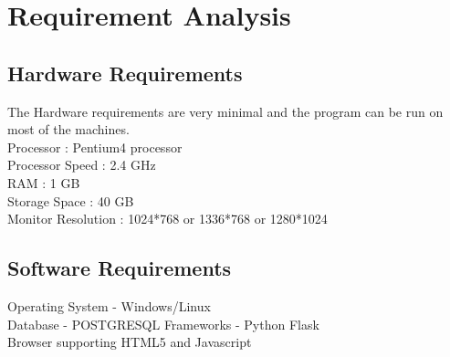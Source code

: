 \chapter{Requirement Analysis}

\section{Hardware Requirements}
The Hardware requirements are very minimal and the program can be run on most of
the machines. \\
Processor : Pentium4 processor\\
Processor Speed : 2.4 GHz\\
RAM : 1 GB\\
Storage Space : 40 GB\\
Monitor Resolution : 1024*768 or 1336*768 or 1280*1024\\
\thispagestyle{fancy}

\section{Software Requirements}
Operating System - Windows/Linux\\
Database - POSTGRESQL
Frameworks - Python Flask\\
Browser supporting HTML5 and Javascript
\thispagestyle{fancy}
